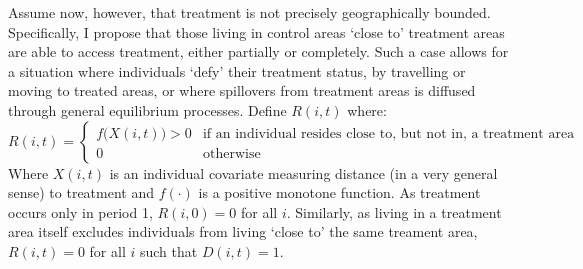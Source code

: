 \documentclass[12pt]{article}
\begin{document}
\begin{spacing}{1.3}
Assume now, however, that treatment is not precisely geographically bounded.  
Specifically, I propose that those living in control areas `close to' treatment 
areas are able to access treatment, either partially or completely.  Such a 
case allows for a situation where individuals `defy' their treatment status, by 
travelling or moving to treated areas, or where spillovers from treatment 
areas is diffused through general equilibrium processes.  Define $R(i,t)$ 
where:
\begin{equation}
\nonumber
 R(i,t) =
  \begin{cases}
   f\Big(X(i,t)\Big)>0   & \text{if an individual resides close to, but not in, a treatment area} \\
   0                            & \text{otherwise} 
  \end{cases}
\end{equation}
Where $X(i,t)$ is an individual covariate measuring distance (in a very general 
sense) to treatment and $f(\cdot)$ is a positive monotone function. As treatment 
occurs only in 
period 1, $R(i,0)=0$ for all $i$.  Similarly, as living in a treatment area 
itself excludes individuals from living `close to' the same treament area, 
$R(i,t)=0$ for all $i$ such that $D(i,t)=1$.


\end{spacing}
\end{document}

